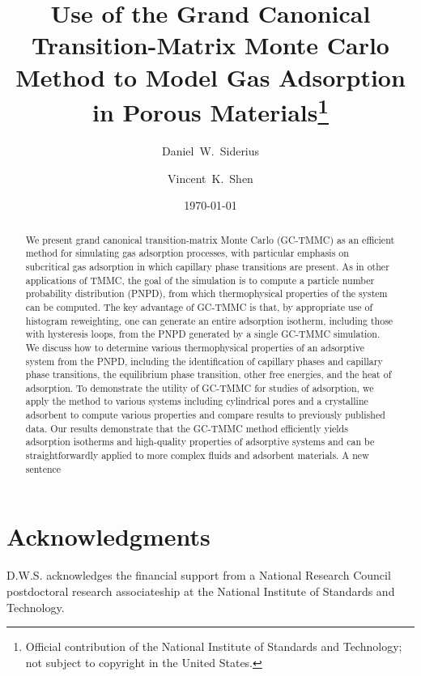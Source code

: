 \documentclass[preprint,prb,showkeys]{revtex4}%
\begin{document}
\title{Use of the Grand Canonical Transition-Matrix Monte Carlo Method to Model Gas Adsorption in Porous Materials\footnote{Official contribution of the National Institute of Standards and Technology; not subject to copyright in the United States.}}
\author{Daniel~W.~Siderius}
\author{Vincent~K.~Shen}


\date{\today}

\begin{abstract}
  We present grand canonical transition-matrix Monte Carlo (GC-TMMC) as an efficient method for simulating gas adsorption processes, with particular emphasis on subcritical gas adsorption in which capillary phase transitions are present.
  As in other applications of TMMC, the goal of the simulation is to compute a particle number probability distribution (PNPD), from which thermophysical properties of the system can be computed.
  The key advantage of GC-TMMC is that, by appropriate use of histogram reweighting, one can generate an entire adsorption isotherm, including those with hysteresis loops, from the PNPD generated by a single GC-TMMC simulation.
  We discuss how to determine various thermophysical properties of an adsorptive system from the PNPD, including the identification of capillary phases and capillary phase transitions, the equilibrium phase transition, other free energies, and the heat of adsorption.
  To demonstrate the utility of GC-TMMC for studies of adsorption, we apply the method to various systems including cylindrical pores and a crystalline adsorbent to compute various properties and compare results to previously published data.
  Our results demonstrate that the GC-TMMC method efficiently yields adsorption isotherms and high-quality properties of adsorptive systems and can be straightforwardly applied to more complex fluids and adsorbent materials.
  A new sentence
\end{abstract}%

\maketitle

\newpage








\section*{Acknowledgments}
D.W.S. acknowledges the financial support from a National Research Council postdoctoral research associateship at the National Institute of Standards and Technology.

%
%


\end{document}

